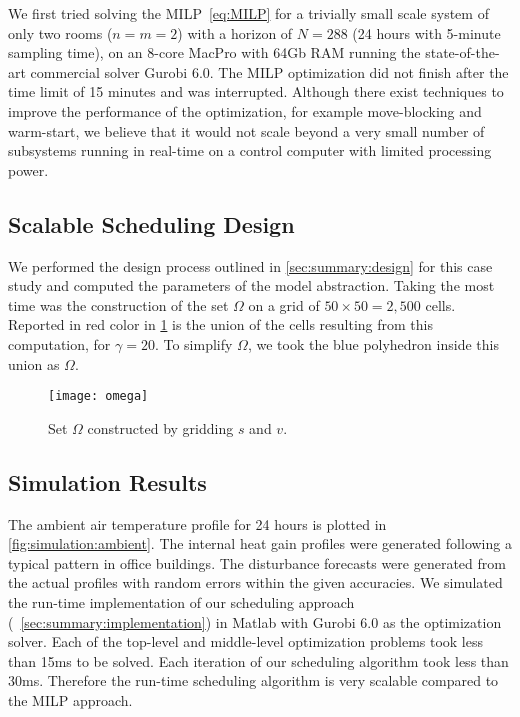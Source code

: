 We first tried solving the MILP~\eqref{eq:MILP} for a trivially small scale system of only two rooms ($n=m=2$) with a horizon of $N=288$ (24 hours with 5-minute sampling time), on an 8-core MacPro with 64Gb RAM running the state-of-the-art commercial solver Gurobi 6.0.
The MILP optimization did not finish after the time limit of 15 minutes and was interrupted.
Although there exist techniques to improve the performance of the optimization, for example move-blocking and warm-start, we believe that it would not scale beyond a very small number of subsystems running in real-time on a control computer with limited processing power.

\subsection{Scalable Scheduling Design}
\label{sec:simulation:design}

We performed the design process outlined in \cref{sec:summary:design} for this case study and computed the parameters of the model abstraction.
Taking the most time was the construction of the set $\Omega$ on a grid of $50 \times 50 = 2\comma 500$ cells.
Reported in red color in \cref{fig:simulation:omega} is the union of the cells resulting from this computation, for $\gamma = 20$.
To simplify $\Omega$, we took the blue polyhedron inside this union as $\Omega$.

\begin{figure}[tb]
  \centering
  \texttt{[image: omega]}
  \caption{Set $\Omega$ constructed by gridding $s$ and $v$.}
    \vspace{-10pt}
  \label{fig:simulation:omega}
\end{figure}


\subsection{Simulation Results}
\label{sec:simulation:results}

The ambient air temperature profile for 24 hours is plotted in \cref{fig:simulation:ambient}.
The internal heat gain profiles were generated following a typical pattern in office buildings.
The disturbance forecasts were generated from the actual profiles with random errors within the given accuracies.
We simulated the run-time implementation of our scheduling approach (~\cref{sec:summary:implementation}) in Matlab with Gurobi 6.0 as the optimization solver.
Each of the top-level and middle-level optimization problems took less than 15ms to be solved.
Each iteration of our scheduling algorithm took less than 30ms.
Therefore the run-time scheduling algorithm is very scalable compared to the MILP approach.

